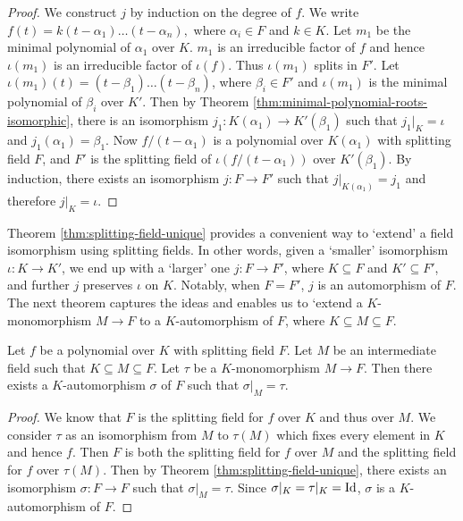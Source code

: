 \begin{proof}
	We construct $j$ by induction on the degree of $f$. We write $ f(t) = k (t - \alpha_1) \ldots (t - \alpha_n), $ where $\alpha_i \in F$ and $k \in K$. Let $m_1$ be the minimal polynomial of $\alpha_1$ over $K$. $m_1$ is an irreducible factor of $f$ and hence $\iota(m_1)$ is an irreducible factor of $\iota(f)$. Thus $\iota(m_1)$ splits in $F'$. Let $\iota(m_1)(t) = (t - \beta_1) \ldots (t - \beta_n)$, where $\beta_i \in F'$ and $\iota(m_1)$ is the minimal polynomial of $\beta_i$ over $K'$. Then by Theorem \ref{thm:minimal-polynomial-roots-isomorphic}, there is an isomorphism $j_1 : K(\alpha_1) \to K'(\beta_1)$ such that $j_1 | _K = \iota$ and $j_1(\alpha_1) = \beta_1$. Now $f / (t - \alpha_1)$ is a polynomial over $K(\alpha_1)$ with splitting field $F$, and $F'$ is the splitting field of $\iota(f / (t - \alpha_1))$ over $K'(\beta_1)$. By induction, there exists an isomorphism $j: F \to F'$ such that $j | _{K(\alpha_1)} = j_1$ and therefore $j | _K = \iota$. 
\end{proof}



Theorem \ref{thm:splitting-field-unique} provides a convenient way to `extend' a field isomorphism using splitting fields. In other words, given a `smaller' isomorphism $\iota: K \to K'$, we end up with a `larger' one $j: F \to F'$, where $K \subseteq F$ and $K' \subseteq F'$, and further $j$ preserves $\iota$ on $K$. Notably, when $F  = F'$, $j$ is an automorphism of $F$. The next theorem captures the ideas and enables us to `extend a $K$-monomorphism $M \to F$ to a $K$-automorphism of $F$, where $K \subseteq M \subseteq F$. 

\begin{theorem} \label{thm:monomorphism-extend-automorphism}
	Let $f$ be a polynomial over $K$ with splitting field $F$. Let $M$ be an intermediate field such that $K \subseteq M \subseteq F$. Let $\tau$ be a $K$-monomorphism $M \to F$. Then there exists a $K$-automorphism $\sigma$ of $F$ such that $\sigma | _M = \tau$.  
\end{theorem}

\begin{proof}
	We know that $F$ is the splitting field for $f$ over $K$ and thus over $M$. We consider $\tau$ as an isomorphism from $M$ to $\tau(M)$ which fixes every element in $K$ and hence $f$. Then $F$ is both the splitting field for $f$ over $M$ and the splitting field for $f$ over $\tau(M)$. Then by Theorem \ref{thm:splitting-field-unique}, there exists an isomorphism $\sigma: F \to F$ such that $\sigma | _M = \tau$. Since $\sigma | _K = \tau |_K = \operatorname{Id}$, $\sigma$ is a $K$-automorphism of $F$. 
\end{proof}

